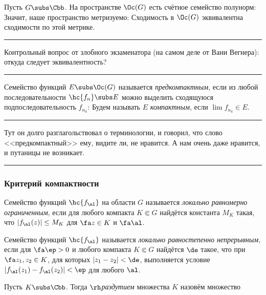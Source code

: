 \documentclass[a4paper]{article}
\newenvironment{petit}
{\par \smallskip \hrule \smallskip \footnotesize}
{\par \smallskip \hrule \smallskip}
\begin{document}
\begin{theorem}
Пусть $G\subs \Cbb$. На пространстве $\Oc(G)$ есть счётное семейство полунорм:
Значит, наше пространство метризуемо:
Сходимость в $\Oc(G)$ эквивалентна сходимости по этой метрике.

\begin{petit}
Контрольный вопрос от злобного экзаменатора (на самом деле от Вани Вегнера): откуда следует эквивалентность?
\end{petit}

\begin{df} Семейство функций $E\subs \Oc(G)$ называется \emph{предкомпактным}, если из
любой последовательности $\hc{f_n}\subs E$ можно выделить сходящуюся подпоследовательность $f_{n_k}$:
Будем называть $E$ \emph{компактным}, если $\lim f_{n_k}\in E$.
\end{df}

\begin{petit}
Тут он долго разглагольствовал о терминологии, и говорил, что слово <<предкомпактный>> ему, видите ли, не нравится.
А нам очень даже нравится, и путаницы не возникает.
\end{petit}


\subsubsection{Критерий компактности}

\begin{df}
Семейство функций $\hc{f_\al}$ на области $G$ называется \emph{локально равномерно ограниченным},
если для любого компакта $K \Subset G$ найдётся константа $M_K$ такая, что $|f_\al(z)| \le M_K$
для $\fa z \in K$ и $\fa \al$.
\end{df}

\begin{df}
Семейство функций $\hc{f_\al}$ называется \emph{локально равностепенно непрерывным}, если для $\fa \ep > 0$ и
любого компакта $K \Subset G$ найдётся $\de$ такое, что при $\fa z_1,z_2\in K$, для которых $|z_1 - z_2| <\de$,
выполняется условие $|f_\al(z_1)-f_\al(z_2)|< \ep$ для любого $\al$.
\end{df}

\begin{df}
Пусть $K \subs \Cbb$. Тогда \emph{$\rh$\д раздутием} множества $K$ назовём множество
\end{df}


\end{theorem}
\end{document}
